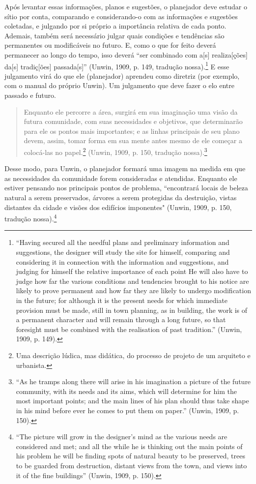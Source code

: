 \documentclass[12pt, a4paper]{book} %
\begin{document}
        Após levantar essas informações, planos e sugestões, o planejador deve estudar o sítio por conta, comparando e considerando-o com as informações e sugestões coletadas, e julgando por si próprio a importância relativa de cada ponto. Ademais, também será necessário julgar quais condições e tendências são permanentes ou modificáveis no futuro. E, como o que for feito deverá permanecer ao longo do tempo, isso deverá ``ser combinado com a[s] realiza[ções] da[s] tradiç[ões] passada[s]'' (Unwin, 1909, p. 149, tradução nossa).\footnote[35]{``Having secured all the needful plans and preliminary information and suggestions, the designer will study the site for himself, comparing and considering it in connection with the information and suggestions, and judging for himself the relative importance of each point He will also have to judge how far the various conditions and tendencies brought to his notice are likely to prove permanent and how far they are likely to undergo modification in the future; for although it is the present needs for which immediate provision must be made, still in town planning, as in building, the work is of a permanent character and will remain through a long future, so that foresight must be combined with the realisation of past tradition.'' (Unwin, 1909, p. 149).} E esse julgamento virá do que ele (planejador) aprendeu como diretriz (por exemplo, com o manual do próprio Unwin). Um julgamento que deve fazer o elo entre passado e futuro.

        \begin{quotation}
            Enquanto ele percorre a área, surgirá em sua imaginação uma visão da futura comunidade, com suas necessidades e objetivos, que determinarão para ele os pontos mais importantes; e as linhas principais de seu plano devem, assim, tomar forma em sua mente antes mesmo de ele começar a colocá-las no papel.\footnote[36]{Uma descrição lúdica, mas didática, do processo de projeto de um arquiteto e urbanista.} (Unwin, 1909, p. 150, tradução nossa).\footnote[37]{ ``As he tramps along there will arise in his imagination a picture of the future community, with its needs and its aims, which will determine for him the most important points; and the main lines of his plan should thus take shape in his mind before ever he comes to put them on paper.'' (Unwin, 1909, p. 150).}
        \end{quotation}

        Desse modo, para Unwin, o planejador formará uma imagem na medida em que as necessidades da comunidade forem consideradas e atendidas. Enquanto ele estiver pensando nos principais pontos de problema, ``encontrará locais de beleza natural a serem preservados, árvores a serem protegidas da destruição, vistas distantes da cidade e visões dos edifícios imponentes" (Unwin, 1909, p. 150, tradução nossa).\footnote[38]{``The picture will grow in the designer's mind as the various needs are considered and met; and all the while he is thinking out the main points of his problem he will be finding spots of natural beauty to be preserved, trees to be guarded from destruction, distant views from the town, and views into it of the fine buildings'' (Unwin, 1909, p. 150).}
\end{document}

